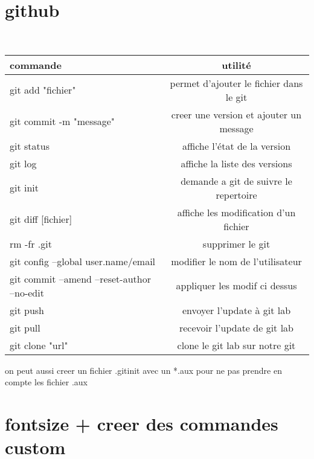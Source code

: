 \documentclass[french,titlepage] {article}
\begin{document}
\section{github}

 \\
\begin{tabular}{|l|c|}
\hline
\textbf{commande} & \textbf{utilité} \\
\hline
\hline
 git add "fichier" & permet d'ajouter le fichier dans le git\\
 git commit -m "message" & creer une version et ajouter un message\\
 git status & affiche l'état de la version\\
 git log & affiche la liste des versions\\
 git init & demande a git de suivre le repertoire\\
 git diff [fichier] & affiche les modification d'un fichier\\
 rm -fr .git & supprimer le git\\
 git config --global user.name/email  & modifier le nom de l'utilisateur\\
 git commit --amend --reset-author --no-edit & appliquer les modif ci dessus\\
 git push & envoyer l'update à git lab\\
 git pull & recevoir l'update de git lab\\
 git clone "url" & clone le git lab sur notre git\\
 
 \hline
\end{tabular}

 on peut aussi creer un fichier .gitinit avec un *.aux pour ne pas prendre en compte les fichier .aux 
 
\section{fontsize + creer des commandes custom}
 
\end{document}
